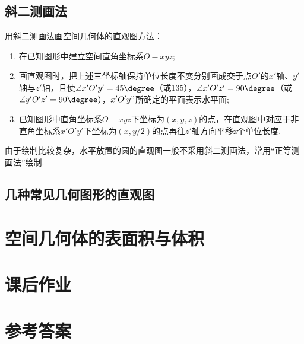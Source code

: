   \subsection{斜二测画法}用斜二测画法画空间几何体的直观图方法：
    \begin{enumerate}[label=\arabic*)]
      \item 在已知图形中建立空间直角坐标系$O-xyz$;
      \item 画直观图时，把上述三坐标轴保持单位长度不变分别画成交于点$O'$的$x'$轴、$y'$轴与$z'$轴，且使$\angle{x'O'y'}=45\degree$（或135\degree），$\angle{x'O'z'}=90\degree$（或$\angle{y'O'z'}=90\degree$），$x'O'y"$所确定的平面表示水平面;
      \item 已知图形中直角坐标系$O-xyz$下坐标为$(x,y,z)$的点，在直观图中对应于非直角坐标系$x'O'y'$下坐标为$(x,y/2)$的点再往$z'$轴方向平移z个单位长度.
    \end{enumerate}
    {\kaishu
      由于绘制比较复杂，水平放置的圆的直观图一般不采用斜二测画法，常用“正等测画法”绘制.
    }
  \subsection{几种常见几何图形的直观图}


\section{空间几何体的表面积与体积}


\newpage
\section{课后作业}
  \begin{exercise}

  \end{exercise}
\stopexercise

\newpage
\section{参考答案}
\begin{multicols}{2}
  \printanswer
\end{multicols}
